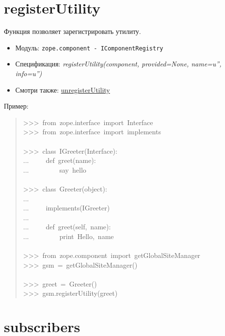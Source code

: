\documentclass[a4paper,openany,twoside,final]{book}
\providecommand*{\DUroletitlereference}[1]{\textsl{#1}}
\begin{document}
\section*{registerUtility%
  \label{registerutility}%
}

Функция позволяет зарегистрировать утилиту.

\begin{itemize}

\item Модуль: \texttt{zope.component - IComponentRegistry}

\item Спецификация: \DUroletitlereference{registerUtility(component, provided=None, name=u'',
info=u'')}

\item Смотри также: \hyperref[unregisterutility]{unregisterUtility}

\end{itemize}

Пример:

\begin{quote}{\ttfamily \raggedright \noindent
>{}>{}>~from~zope.interface~import~Interface\\
>{}>{}>~from~zope.interface~import~implements\\
~\\
>{}>{}>~class~IGreeter(Interface):\\
...~~~~~def~greet(name):\\
...~~~~~~~~~\textquotedbl{}say~hello\textquotedbl{}\\
~\\
>{}>{}>~class~Greeter(object):\\
...\\
...~~~~~implements(IGreeter)\\
...\\
...~~~~~def~greet(self,~name):\\
...~~~~~~~~~print~\textquotedbl{}Hello\textquotedbl{},~name\\
~\\
>{}>{}>~from~zope.component~import~getGlobalSiteManager\\
>{}>{}>~gsm~=~getGlobalSiteManager()\\
~\\
>{}>{}>~greet~=~Greeter()\\
>{}>{}>~gsm.registerUtility(greet)
}
\end{quote}


\section*{subscribers%
  \label{subscribers}%
}
\end{document}
